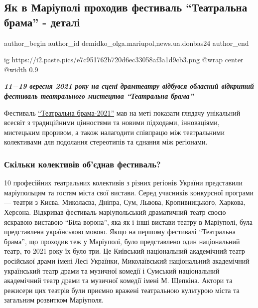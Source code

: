  
 
 
 
 
 
\subsection{Як в Маріуполі проходив фестиваль \enquote{Театральна брама} - деталі}
\label{sec:12_09_2022.stz.news.ua.donbas24.1.festival_teatralna_brama_detali}
 
\ifcmt
 author_begin
   author_id demidko_olga.mariupol,news.ua.donbas24
 author_end
\fi

\ifcmt
  ig https://i2.paste.pics/e7c951762b720d6ec33058af3a1d9cb3.png
  @wrap center
  @width 0.9
\fi

\begin{center}
  \em\color{blue}\bfseries\Large
11−19 вересня 2021 року на сцені драмтеатру відбувся обласний відкритий
фестиваль театрального мистецтва \enquote{Театральна брама}
\end{center}

Фестиваль \href{https://www.facebook.com/TeatralnaBrama}{\enquote{Театральна брама-2021}} мав на меті показати глядачу унікальний
всесвіт з традиційними цінностями та новими підходами, інноваціями, мистецьким
проривом, а також налагодити співпрацю між театральними колективами для
подолання стереотипів та єднання між регіонами.

\subsubsection{Скільки колективів об'єднав фестиваль?}


10 професійних театральних колективів з різних регіонів України представили
маріупольцям та гостям міста свої вистави. Серед учасників конкурсної програми
— театри з Києва, Миколаєва, Дніпра, Сум, Львова, Кропивницького, Харкова,
Херсона. Відкривав фестиваль маріупольський драматичний театр своєю яскравою
виставою \enquote{Біла ворона}, яка як і інші вистави театру в Маріуполі, була
представлена українською мовою. Якщо на першому фестивалі \enquote{Театральна брама},
що проходив теж у Маріуполі, було представлено один національний театр, то 2021
року їх було три. Це Київський національний академічний театр російської драми
імені Лесі Українки, Миколаївський національний академічний український театр
драми та музичної комедії і Сумський національний академічний театр драми та
музичної комедії імені М. Щепкіна. Актори та режисери цих театрів були приємно
вражені театральною культурою міста та загальним розвитком Маріуполя.

